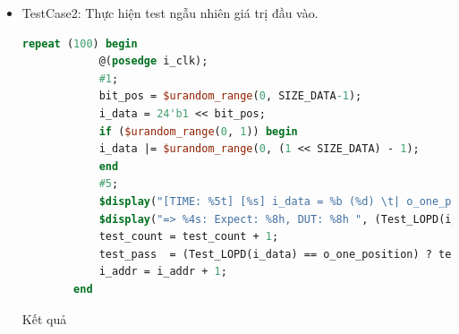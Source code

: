 \begin{itemize}[label=-]
	\begin{lstlisting}[style=StyleResult, language=Result, caption={Kết quả của TestCase1.}]
		[TIME: 41000] [Direcly] i_data = 000000000000000000000001 (       1) 	| o_one_position = 00000 ( 0) 	| o_zero_flag = 0
		=> PASS: Expect: 00000000, DUT: 00000000 
		[TIME: 51000] [Direcly] i_data = 000000000000000000000010 (       2) 	| o_one_position = 00001 ( 1) 	| o_zero_flag = 0
		=> PASS: Expect: 00000001, DUT: 00000001 
		[TIME: 61000] [Direcly] i_data = 000000000000000000000100 (       4) 	| o_one_position = 00010 ( 2) 	| o_zero_flag = 0
		=> PASS: Expect: 00000002, DUT: 00000002 
		[TIME: 71000] [Direcly] i_data = 000000000000000000001000 (       8) 	| o_one_position = 00011 ( 3) 	| o_zero_flag = 0
		=> PASS: Expect: 00000003, DUT: 00000003 
		...
		[TIME: 261000] [Direcly] i_data = 010000000000000000000000 ( 4194304) 	| o_one_position = 10110 (22) 	| o_zero_flag = 0
		=> PASS: Expect: 00000016, DUT: 00000016 
		[TIME: 271000] [Direcly] i_data = 100000000000000000000000 ( 8388608) 	| o_one_position = 10111 (23) 	| o_zero_flag = 0
		=> PASS: Expect: 00000017, DUT: 00000017 
	\end{lstlisting}

	\item TestCase2: Thực hiện test ngẫu nhiên giá trị đầu vào.
	
	\begin{lstlisting}[style=StyleCode, language=SystemVerilog, caption={Test 100 trường hợp đầu vào ngẫunhiên cho bộ LOPD 24-bit.}]
		repeat (100) begin
			@(posedge i_clk);
			#1;
			bit_pos = $urandom_range(0, SIZE_DATA-1);
			i_data = 24'b1 << bit_pos;
			if ($urandom_range(0, 1)) begin
			i_data |= $urandom_range(0, (1 << SIZE_DATA) - 1);
			end
			#5;
			$display("[TIME: %5t] [%s] i_data = %b (%d) \t| o_one_position = %b (%d) \t| o_zero_flag = %b", $time, "Random", i_data, i_data, o_one_position, o_one_position, o_zero_flag);
			$display("=> %4s: Expect: %8h, DUT: %8h ", (Test_LOPD(i_data) == o_one_position) ? "PASS" : "FAIL", o_one_position, Test_LOPD(i_data));
			test_count = test_count + 1;
			test_pass  = (Test_LOPD(i_data) == o_one_position) ? test_pass + 1 : test_pass;
			i_addr = i_addr + 1;
		end
	\end{lstlisting}

	Kết quả
	

\end{itemize}
